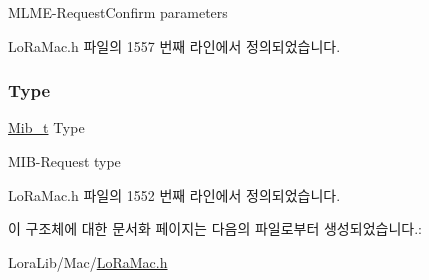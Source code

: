 M\+L\+M\+E-\/\+Request\+Confirm parameters 

Lo\+Ra\+Mac.\+h 파일의 1557 번째 라인에서 정의되었습니다.

\mbox{\label{structe_mib_request_confirm_ada1f9249fb28125c69bdfacfaeeae0e2}} 
\subsubsection{\texorpdfstring{Type}{Type}}
{\footnotesize\ttfamily \mbox{\hyperlink{group___l_o_r_a_m_a_c_gaf17bd3de9ec75e4954be9a070cd8ddf9}{Mib\+\_\+t}} Type}

M\+I\+B-\/\+Request type 

Lo\+Ra\+Mac.\+h 파일의 1552 번째 라인에서 정의되었습니다.



이 구조체에 대한 문서화 페이지는 다음의 파일로부터 생성되었습니다.\+:\begin{DoxyCompactItemize}
\item 
Lora\+Lib/\+Mac/\mbox{\hyperlink{_lo_ra_mac_8h}{Lo\+Ra\+Mac.\+h}}\end{DoxyCompactItemize}
